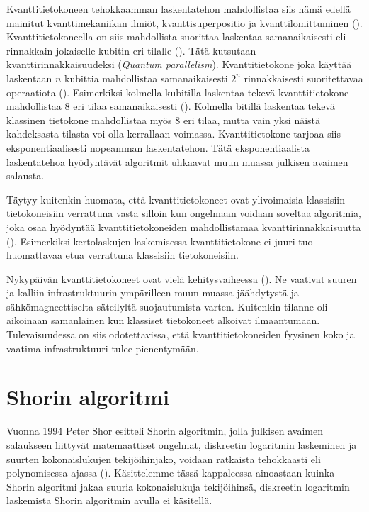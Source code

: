 Kvanttitietokoneen tehokkaamman laskentatehon mahdollistaa siis nämä edellä mainitut kvanttimekaniikan ilmiöt, kvanttisuperpositio ja kvanttilomittuminen (\cite{mavroeidis2018impact}). Kvanttitietokoneella on siis mahdollista suorittaa laskentaa samanaikaisesti eli rinnakkain jokaiselle kubitin eri tilalle (\cite{doi:10.1080/23742917.2016.1226650}). Tätä kutsutaan kvanttirinnakkaisuudeksi (\emph{Quantum parallelism}). Kvanttitietokone joka käyttää laskentaan $n$ kubittia mahdollistaa samanaikaisesti $2^{n}$ rinnakkaisesti suoritettavaa operaatiota (\cite{mavroeidis2018impact}). Esimerkiksi kolmella kubitilla laskentaa tekevä kvanttitietokone mahdollistaa 8 eri tilaa samanaikaisesti (\cite{doi:10.1080/23742917.2016.1226650}). Kolmella bitillä laskentaa tekevä klassinen tietokone mahdollistaa myös 8 eri tilaa, mutta vain yksi näistä kahdeksasta tilasta voi olla kerrallaan voimassa.  Kvanttitietokone tarjoaa siis eksponentiaalisesti nopeamman laskentatehon. Tätä eksponentiaalista laskentatehoa hyödyntävät algoritmit uhkaavat muun muassa julkisen avaimen salausta.

Täytyy kuitenkin huomata, että kvanttitietokoneet ovat ylivoimaisia klassisiin tietokoneisiin verrattuna vasta silloin kun ongelmaan voidaan soveltaa algoritmia, joka osaa hyödyntää kvanttitietokoneiden mahdollistamaa kvanttirinnakkaisuutta (\cite{mavroeidis2018impact}). Esimerkiksi kertolaskujen laskemisessa kvanttitietokone ei juuri tuo huomattavaa etua verrattuna klassisiin tietokoneisiin.

Nykypäivän kvanttitietokoneet ovat vielä kehitysvaiheessa (\cite{doi:10.1080/23742917.2016.1226650}). Ne vaativat suuren ja kalliin infrastruktuurin ympärilleen muun muassa jäähdytystä ja sähkömagneettiselta säteilyltä suojautumista varten. Kuitenkin tilanne oli aikoinaan samanlainen kun klassiset tietokoneet alkoivat ilmaantumaan. Tulevaisuudessa on siis odotettavissa, että kvanttitietokoneiden fyysinen koko ja vaatima infrastruktuuri tulee pienentymään.

\section{Shorin algoritmi}
Vuonna 1994 Peter Shor esitteli Shorin algoritmin, jolla julkisen avaimen salaukseen liittyvät matemaattiset ongelmat, diskreetin logaritmin laskeminen ja suurten kokonaislukujen tekijöihinjako, voidaan ratkaista tehokkaasti eli polynomisessa ajassa (\cite{doi:10.1137/S0036144598347011}). Käsittelemme tässä kappaleessa ainoastaan kuinka Shorin algoritmi jakaa suuria kokonaislukuja tekijöihinsä, diskreetin logaritmin laskemista Shorin algoritmin avulla ei käsitellä.

